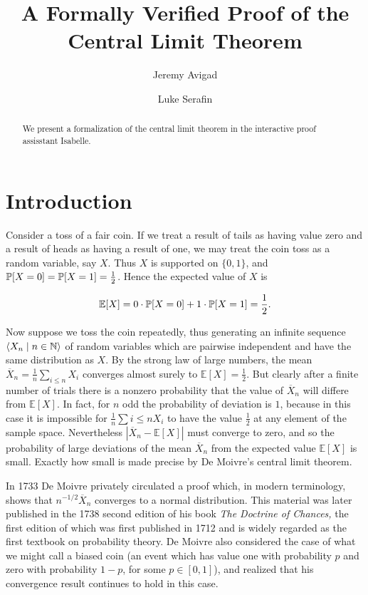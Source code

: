 \documentclass{amsart}
\title{A Formally Verified Proof of the Central Limit Theorem}
\author{Jeremy Avigad \and Luke Serafin}
\theoremstyle{definition}
\theoremstyle{remark}
\newcommand{\bldseq}[2]{\langle{#1}\mid{#2}\rangle}
\renewcommand{\E}{\mathbb E}
\begin{document}
\begin{abstract}
We present a formalization of the central limit theorem in the interactive proof assisstant Isabelle.
\end{abstract}

\maketitle

\section{Introduction}

Consider a toss of a fair coin. If we treat a result of tails as having value zero and a result of heads as having a result of one, we may treat the coin toss as a random variable, say $X$. Thus $X$ is supported on $\{0,1\}$, and $\P[X = 0] = \P[X = 1] = \frac{1}{2}$. Hence the expected value of $X$ is

\[ \E[X] = 0 \cdot \P[X = 0] + 1 \cdot \P[X = 1] = \frac{1}{2}. \]

Now suppose we toss the coin repeatedly, thus generating an infinite sequence $\bldseq{X_n}{n \in \N}$ of random variables which are pairwise independent and have the same distribution as $X$. By the strong law of large numbers, the mean $\overline X_n = \frac{1}{n} \sum_{i \le n} X_i$ converges almost surely to $\E[X] = \frac{1}{2}$. But clearly after a finite number of trials there is a nonzero probability that the value of $\overline X_n$ will differe from $\E[X]$. In fact, for $n$ odd the probability of deviation is $1$, because in this case it is impossible for $\frac{1}{n} \sum{i \le n} X_i$ to have the value $\frac{1}{2}$ at any element of the sample space. Nevertheless $|\overline X_n - \E[X]|$ must converge to zero, and so the probability of large deviations of the mean $\overline X_n$ from the expected value $\E[X]$ is small. Exactly how small is made precise by De Moivre's central limit theorem.

In 1733 De Moivre privately circulated a proof which, in modern terminology, shows that $n^{-1/2} \overline X_n$ converges to a normal distribution. This material was later published in the 1738 second edition of his book {\em The Doctrine of Chances,} the first edition of which was first published in 1712 and is widely regarded as the first textbook on probability theory. De Moivre also considered the case of what we might call a biased coin (an event which has value one with probability $p$ and zero with probability $1-p$, for some $p \in [0,1]$), and realized that his convergence result continues to hold in this case.
\end{document}
